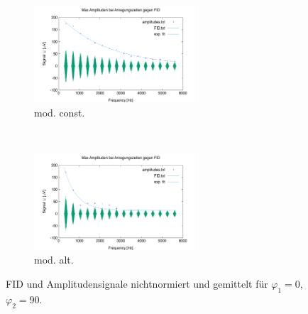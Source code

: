 \documentclass[../../main.tex]{subfiles}
\begin{document}
        \begin{figure}[H]
            \centering
            \begin{subfigure}[b]{0.4\textwidth}
                \centering
                \includegraphics[width=6cm]{Bilddateien/10/CPMG-0-90-constant-avg.png}
                \caption{mod. const.}
                \label{fig:CPMG-0-90-constant-avg}
            \end{subfigure}
            \
            \begin{subfigure}[b]{0.4\textwidth}
                \centering
                \includegraphics[width=6cm]{Bilddateien/10/CPMG-0-90-alternating-avg.png}
                \caption{mod. alt.}
                \label{fig:CPMG-0-90-alternating-avg}
            \end{subfigure}
            \caption{FID und Amplitudensignale nichtnormiert und gemittelt für $\varphi_1 = 0$, $\varphi_2 = 90$.}
            \label{fig:CPMG-0-90-avg}
        \end{figure}
        
\end{document}
